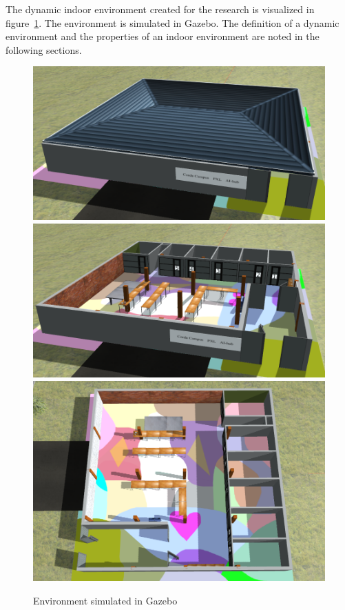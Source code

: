 The dynamic indoor environment created for the research is visualized in figure~\ref{fig:indoor_gazebo}. The environment is simulated in Gazebo. The definition of a dynamic environment and the properties of an indoor environment are noted in the following sections.

\begin{figure}[!h]
  \centering
  \includegraphics[width=0.6\linewidth]{images/indoor_environment_roof.png}
  \includegraphics[width=0.6\linewidth]{images/indoor_environment_without_roof.png}
  \includegraphics[width=0.6\linewidth]{images/indoor_environment_top.png}
  \caption{Environment simulated in Gazebo}
  \label{fig:indoor_gazebo}
\end{figure}